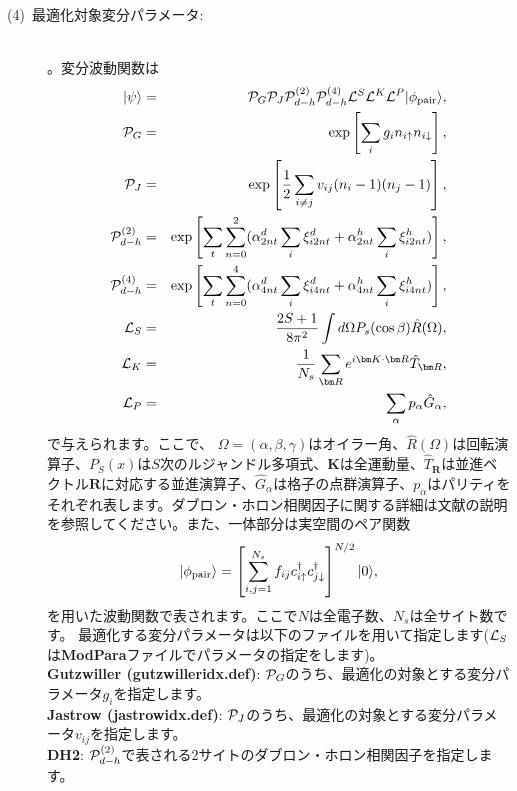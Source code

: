 \begin{description}
\item[(4)~最適化対象変分パラメータ:] 
~\\ 。変分波動関数は
\begin{eqnarray}
|\psi \rangle &=& {\cal P}_G{\cal P}_J{\cal P}_{d-h}^{(2)}{\cal P}_{d-h}^{(4)}{\cal L}^S{\cal L}^K{\cal L}^P |\phi_{\rm pair} \rangle,\\
{\cal P}_G&=&\exp\left[ \sum_i g_i n_{i\uparrow} n_{i\downarrow} \right],\\
{\cal P}_J&=&\exp\left[\frac{1}{2} \sum_{i\neq j} v_{ij} (n_i-1)(n_j-1)\right],\\
{\cal P}_{d-h}^{(2)}&=& \exp \left[ \sum_t \sum_{n=0}^2 (\alpha_{2nt}^d \sum_{i}\xi_{i2nt}^d+\alpha_{2nt}^h \sum_{i}\xi_{i2nt}^h)\right],\\
{\cal P}_{d-h}^{(4)}&=& \exp \left[ \sum_t \sum_{n=0}^4 (\alpha_{4nt}^d \sum_{i}\xi_{i4nt}^d+\alpha_{4nt}^h \sum_{i}\xi_{i4nt}^h)\right],\\
{\cal L}_S&=&\frac{2S+1}{8 \pi^2}\int d\Omega P_s(\cos \beta) \hat{R}(\Omega),\\
{\cal L}_K&=&\frac{1}{N_s}\sum_{{\bm R}}e^{i {\bm K} \cdot{\bm R} } \hat{T}_{\bm R},\\
{\cal L}_P&=&\sum_{\alpha}p_{\alpha} \hat{G}_{\alpha},
\end{eqnarray}
で与えられます。ここで、 $\Omega=(\alpha, \beta, \gamma)$はオイラー角、$\hat{R}(\Omega)$は回転演算子、$P_S(x)$は$S$次のルジャンドル多項式、${\bm K}$は全運動量、$\hat{T}_{\bm R}$は並進ベクトル${\bm R}$に対応する並進演算子、$\hat{G}_{\alpha}$は格子の点群演算子、$p_\alpha$はパリティをそれぞれ表します。ダブロン・ホロン相関因子に関する詳細は文献\cite{Tahara2008}の説明を参照してください。また、一体部分は実空間のペア関数
\begin{equation}
|\phi_{\rm pair} \rangle = \left[\sum_{i, j=1}^{N_s} f_{ij}c_{i\uparrow}^{\dag}c_{j\downarrow}^{\dag} \right]^{N/2}|0 \rangle,
\end{equation}
を用いた波動関数で表されます。ここで$N$は全電子数、$N_s$は全サイト数です。
最適化する変分パラメータは以下のファイルを用いて指定します(${\cal L}_S$は{\bf ModPara}ファイルでパラメータの指定をします)。
~\\{\bf Gutzwiller (gutzwilleridx.def)}: ${\cal P}_G$のうち、最適化の対象とする変分パラメータ$g_i$を指定します。
~\\{\bf Jastrow (jastrowidx.def)}: ${\cal P}_J$のうち、最適化の対象とする変分パラメータ$v_{ij}$を指定します。
~\\{\bf DH2}:  ${\cal P}_{d-h}^{(2)}$で表される2サイトのダブロン・ホロン相関因子を指定します。

\end{description}
